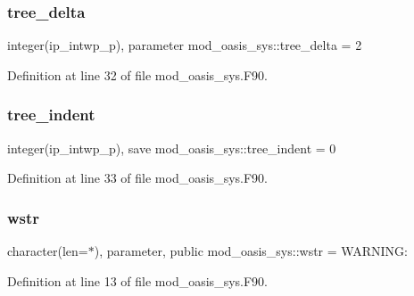 \subsubsection{\texorpdfstring{tree\+\_\+delta}{tree\_delta}}
{\footnotesize\ttfamily integer(ip\+\_\+intwp\+\_\+p), parameter mod\+\_\+oasis\+\_\+sys\+::tree\+\_\+delta = 2\hspace{0.3cm}{\ttfamily [private]}}



Definition at line 32 of file mod\+\_\+oasis\+\_\+sys.\+F90.

\mbox{\label{namespacemod__oasis__sys_a159b60d106efcb1f42722b08c5511ad0}} 
\subsubsection{\texorpdfstring{tree\+\_\+indent}{tree\_indent}}
{\footnotesize\ttfamily integer(ip\+\_\+intwp\+\_\+p), save mod\+\_\+oasis\+\_\+sys\+::tree\+\_\+indent = 0\hspace{0.3cm}{\ttfamily [private]}}



Definition at line 33 of file mod\+\_\+oasis\+\_\+sys.\+F90.

\mbox{\label{namespacemod__oasis__sys_a4e16ba69c68a3a39c8b8aa3b92234ce1}} 
\subsubsection{\texorpdfstring{wstr}{wstr}}
{\footnotesize\ttfamily character(len=$\ast$), parameter, public mod\+\_\+oasis\+\_\+sys\+::wstr = \textquotesingle{} W\+A\+R\+N\+I\+N\+G\+: \textquotesingle{}}



Definition at line 13 of file mod\+\_\+oasis\+\_\+sys.\+F90.

